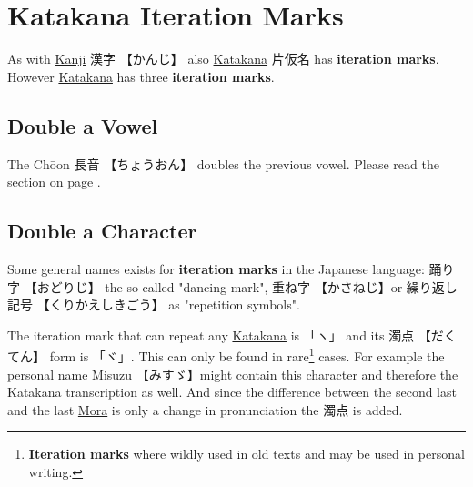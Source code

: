 \section{Katakana Iteration Marks}
\label{sec:Iteration}
\label{sec:KatakanaIterationMarks}
\label{sec:Choon}
\label{sec:RepitionMark}
\label{sec:RepitionMarkForKanjiAndKana}
\label{sec:Kunojiten}

As with \hyperref[sec:Kanji]{Kanji} {漢字} {【かんじ】} also
\hyperref[sec:Katakana]{Katakana} {片仮名} has \textbf{iteration marks}.
However \hyperref[sec:Katakana]{Katakana} has three \textbf{iteration marks}. 

\subsection{Double a Vowel}\label{subsec:Choon}


The Chōon {長音} {【ちょうおん】} doubles the previous vowel. Please read the
section  on page \pageref{subsec:DoublingVowels}.

\subsection{Double a Character}

Some general names exists for \textbf{iteration marks} in the Japanese
language: {踊り字} {【おどりじ】} the so called  "dancing mark", {重ね字}
{【かさねじ】}or  {繰り返し記号} {【くりかえしきごう】} as "repetition symbols".


The iteration mark that can repeat any \hyperref[sec:Katakana]{Katakana} is
{「ヽ」}  and its {濁点} {【だくてん】} form is {「ヾ」}. This can only be
found in rare\footnote{\textbf{Iteration marks} where wildly used in old texts
and may be used in personal writing.} cases. For example the personal name
Misuzu 【みすゞ】might contain this character and therefore the Katakana
transcription as well. And since the difference between the second last and
the last \hyperref[sec:Mora]{Mora} is only a change in pronunciation the {濁点}
is added.

